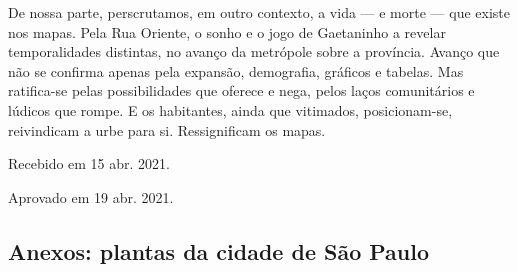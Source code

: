 \begin{refsection}
    De nossa parte, perscrutamos, em outro contexto, a vida --- e morte --- que existe nos mapas. Pela Rua Oriente, o sonho e o jogo de Gaetaninho a revelar temporalidades distintas, no avanço da metrópole sobre a província. Avanço que não se confirma apenas pela expansão, demografia, gráficos e tabelas. Mas ratifica-se pelas possibilidades que oferece e nega, pelos laços comunitários e lúdicos que rompe. E os habitantes, ainda que vitimados, posicionam-se, reivindicam a urbe para si. Ressignificam os mapas.

    \printbibliography[heading=subbibliography,notcategory=fullcited]

    \hfill Recebido em 15 abr. 2021.

    \hfill Aprovado em 19 abr. 2021.

    \cleardoublepage

    \begin{vplace}
        \section*{Anexos: plantas da cidade de São Paulo}
    \end{vplace}

    \clearpage

    \begin{vplace}
        \centering
    \end{vplace}


\end{refsection}
